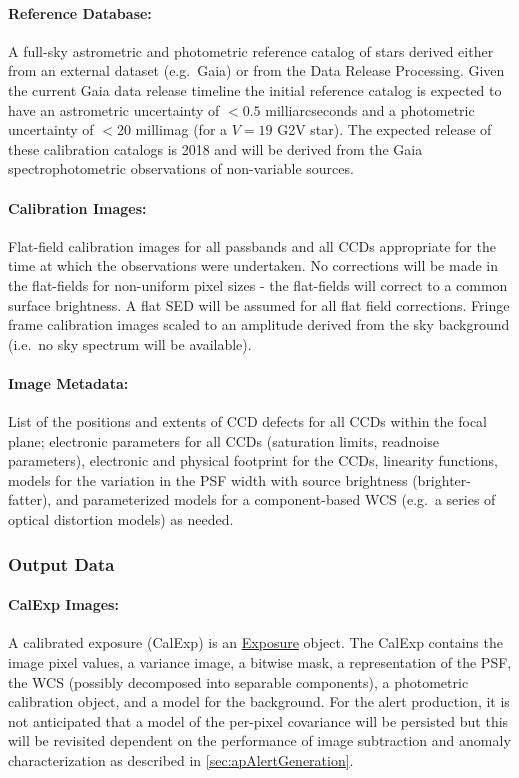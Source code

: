 \paragraph*{Reference Database:} A full-sky astrometric and photometric reference catalog of stars derived either from an external dataset (e.g.\ Gaia) or from the Data Release Processing. Given the current Gaia data release timeline the initial reference catalog is expected to have an astrometric uncertainty of $<0.5$ milliarcseconds and a photometric uncertainty of $<$20 millimag (for a $V=19$ G2V star). The expected release of these calibration catalogs is 2018 and will be derived from the Gaia spectrophotometric observations of non-variable sources.

\paragraph*{Calibration Images:} Flat-field calibration images for all passbands and all CCDs appropriate for the time at which the observations were undertaken. No corrections will be made in the flat-fields for non-uniform pixel sizes - the flat-fields will correct to a common  surface brightness. A flat SED will be assumed for all flat field corrections. Fringe frame calibration images scaled to an amplitude derived from the sky background (i.e.\ no sky spectrum will be available).

\paragraph*{Image Metadata:} List of the positions and extents of CCD defects for all CCDs within the focal plane; electronic parameters for all CCDs (saturation limits, readnoise parameters), electronic and physical footprint for the CCDs, linearity functions, models for the variation in the PSF width with source brightness (brighter-fatter), and parameterized models for a component-based  WCS (e.g.\ a series of optical distortion models) as needed.

\subsubsection{Output Data}
\label{sec:apSFMoutput}

\paragraph*{CalExp Images:} A calibrated exposure (CalExp) is an \hyperref[sec:spImagesExposure]{Exposure} object. The CalExp contains the image pixel values, a variance image, a bitwise mask, a representation of the PSF, the WCS (possibly decomposed into separable components), a photometric calibration object, and a model for the  background. For the alert production, it is not anticipated that a model of the per-pixel covariance will be persisted but this will be revisited dependent on the performance of image subtraction and anomaly characterization as described in \ref{sec:apAlertGeneration}.

